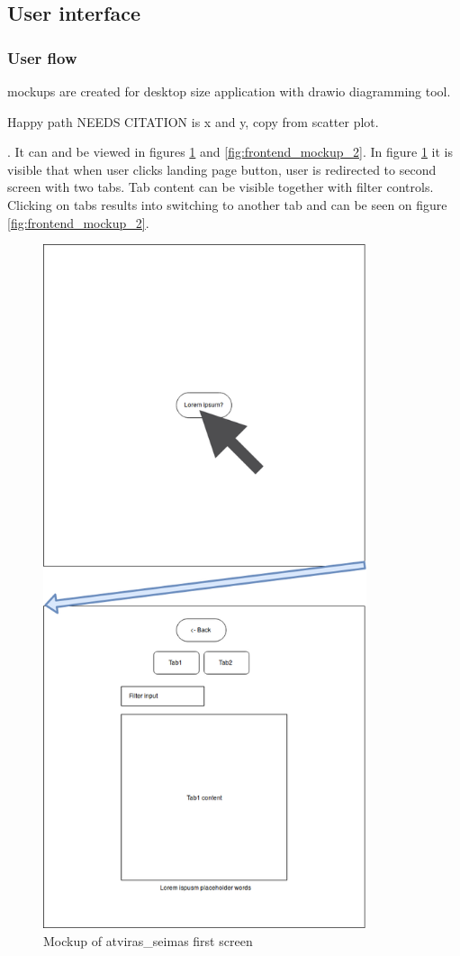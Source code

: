 \documentclass[a4paper,12pt]{article}
\begin{document}
	\clearpage
	
	\subsection{User interface}
	
	\subsubsection{User flow}
	
	\glspl{mockup} are created for desktop size application with \gls{drawio} diagramming tool.
	
	Happy path NEEDS CITATION is x and y, copy from scatter plot.
	
	. It can and be viewed in figures \ref{fig:frontend_mockup} and \ref{fig:frontend_mockup_2}. In figure \ref{fig:frontend_mockup} it is visible that  when user clicks landing page button, user is redirected to second screen with two tabs. Tab content can be visible together with filter controls. Clicking on tabs results into switching to another tab and can be seen on figure \ref{fig:frontend_mockup_2}.
	
	\begin{figure}[H]	
		\centering
		\includegraphics[width=9.5cm]{images/frontend_mockup_crop_1.png}
		\caption{Mockup of \gls{atviras_seimas} first screen}
		\label{fig:frontend_mockup}
	\end{figure}
	
\end{document}
